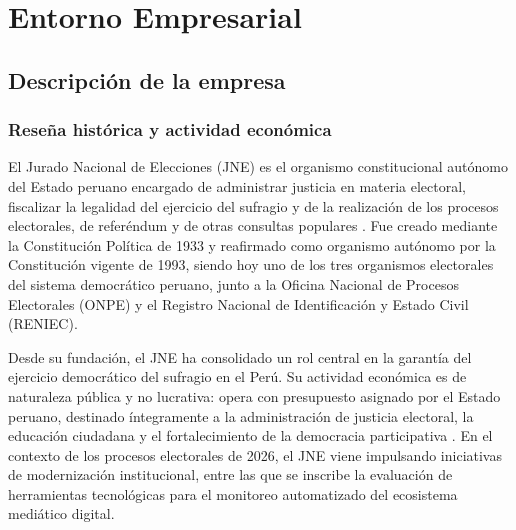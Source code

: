 
\chapter{Entorno Empresarial}

\section{Descripción de la empresa}

\subsection{Reseña histórica y actividad económica}

El Jurado Nacional de Elecciones (JNE) es el organismo constitucional autónomo del Estado peruano encargado de administrar justicia en materia electoral, fiscalizar la legalidad del ejercicio del sufragio y de la realización de los procesos electorales, de referéndum y de otras consultas populares \parencite{ent_jne2023institucional}. Fue creado mediante la Constitución Política de 1933 y reafirmado como organismo autónomo por la Constitución vigente de 1993, siendo hoy uno de los tres organismos electorales del sistema democrático peruano, junto a la Oficina Nacional de Procesos Electorales (ONPE) y el Registro Nacional de Identificación y Estado Civil (RENIEC).

Desde su fundación, el JNE ha consolidado un rol central en la garantía del ejercicio democrático del sufragio en el Perú. Su actividad económica es de naturaleza pública y no lucrativa: opera con presupuesto asignado por el Estado peruano, destinado íntegramente a la administración de justicia electoral, la educación ciudadana y el fortalecimiento de la democracia participativa \parencite{ent_jne2023institucional}. En el contexto de los procesos electorales de 2026, el JNE viene impulsando iniciativas de modernización institucional, entre las que se inscribe la evaluación de herramientas tecnológicas para el monitoreo automatizado del ecosistema mediático digital.

